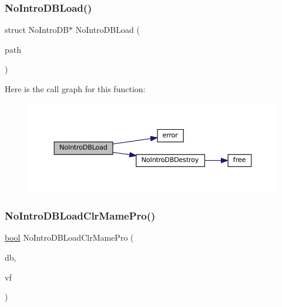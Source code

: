\subsubsection{\texorpdfstring{No\+Intro\+D\+B\+Load()}{NoIntroDBLoad()}}
{\footnotesize\ttfamily struct No\+Intro\+DB$\ast$ No\+Intro\+D\+B\+Load (\begin{DoxyParamCaption}\item[{const char $\ast$}]{path }\end{DoxyParamCaption})}

Here is the call graph for this function\+:
\nopagebreak
\begin{figure}[H]
\begin{center}
\leavevmode
\includegraphics[width=350pt]{no-intro_8c_a467dbcef29eb2a06f7b5747e6ee4fddb_cgraph}
\end{center}
\end{figure}
\mbox{\label{no-intro_8c_a0ce34503c62adbfd6accf09a9ce89260}} 
\subsubsection{\texorpdfstring{No\+Intro\+D\+B\+Load\+Clr\+Mame\+Pro()}{NoIntroDBLoadClrMamePro()}}
{\footnotesize\ttfamily \mbox{\hyperlink{libretro_8h_a4a26dcae73fb7e1528214a068aca317e}{bool}} No\+Intro\+D\+B\+Load\+Clr\+Mame\+Pro (\begin{DoxyParamCaption}\item[{struct No\+Intro\+DB $\ast$}]{db,  }\item[{struct V\+File $\ast$}]{vf }\end{DoxyParamCaption})}

